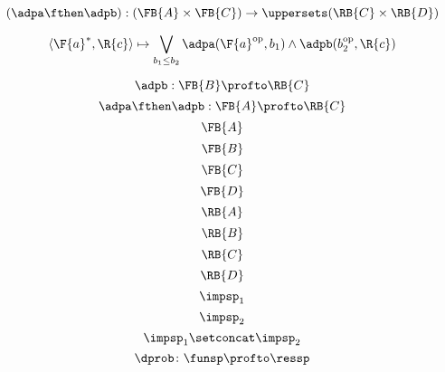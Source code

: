 {\begin{forslides}
        \begin{equation}
            \label{eq:adpM12us}
            (\adpa\fthen\adpb):(\FB{A} \times \FB{C})  \to\uppersets (\RB{C} \times \RB{D})
        \end{equation}

        \begin{equation}
            \label{eq:adp12pfexpr}
            \langle\F{a}^*, \R{c}\rangle \mapsto \bigvee_{b_1\leq b_2} \adpa(\F{a}^{\text{op}}, b_1) \wedge \adpb(b_2^{\text{op}}, \R{c})
        \end{equation}

        \begin{equation}
            \label{eq:adp2}
            \adpb: \FB{B} \profto  \RB{C}
        \end{equation}
        \begin{equation}
            \label{eq:adp1adp2}
            \adpa\fthen\adpb: \FB{A} \profto  \RB{C}
        \end{equation}
        \begin{equation}
            \label{eq:FA}
            \FB{A}
        \end{equation}
        \begin{equation}
            \label{eq:FB}
            \FB{B}
        \end{equation}
        \begin{equation}
            \label{eq:FC}
            \FB{C}
        \end{equation}
        \begin{equation}
            \label{eq:FD}
            \FB{D}
        \end{equation}
        \begin{equation}
            \label{eq:RA}
            \RB{A}
        \end{equation}
        \begin{equation}
            \label{eq:RB}
            \RB{B}
        \end{equation}
        \begin{equation}
            \label{eq:RC}
            \RB{C}
        \end{equation}
        \begin{equation}
            \label{eq:RD}
            \RB{D}
        \end{equation}
        \begin{equation}
            \label{eq:impsp1}
            \impsp_1
        \end{equation}
        \begin{equation}
            \label{eq:impsp2}
            \impsp_2
        \end{equation}
        \begin{equation}
            \label{eq:impsp12}
            \impsp_{1} \setconcat \impsp_{2}
        \end{equation}
        \begin{equation}
            \label{eq:dproba}
            \dprob \colon \funsp \profto \ressp
        \end{equation}


\end{forslides}}
